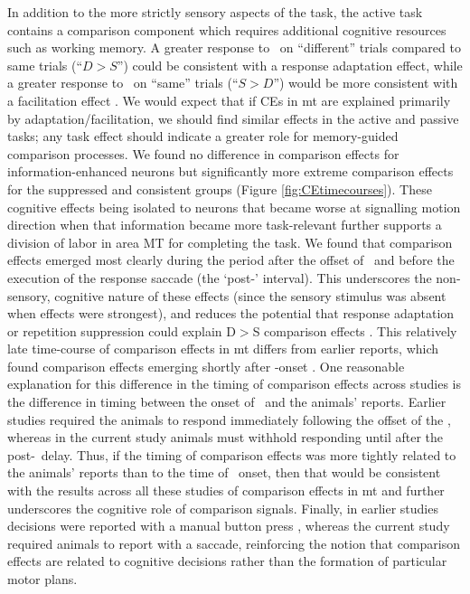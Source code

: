 In addition to the more strictly sensory aspects of the task, the active task contains a comparison component which requires additional cognitive resources such as working memory. 
A greater response to \test\ on ``different'' trials compared to same trials (``$D>S$'') could be consistent with a response adaptation effect, while a greater response to \test\ on ``same'' trials (``$S>D$'') would be more consistent with a facilitation effect \parencite{Kohn2003}. We would expect that if CEs in \gls{mt} are explained primarily by adaptation/facilitation, we should find similar effects in the active and passive tasks; any task effect should indicate a greater role for memory-guided comparison processes.
We found no difference in comparison effects for information-enhanced neurons but significantly more extreme comparison effects for the suppressed and consistent groups (Figure \ref{fig:CEtimecourses}).
These cognitive effects being isolated to neurons that became worse at signalling motion direction when that information became more task-relevant further supports a division of labor in area MT for completing the task.
We found that comparison effects emerged most clearly during the period after the offset of \test\ and before the execution of the response saccade (the `post-\test' interval). 
This underscores the non-sensory, cognitive nature of these effects (since the sensory stimulus was absent when effects were strongest), and reduces the potential that response adaptation or repetition suppression could explain D$>$S comparison effects \parencite{Lui2011,Kohn2003}.
This relatively late time-course of comparison effects in \gls{mt} differs from earlier reports, which found comparison effects emerging shortly after \test-onset \parencite{Lui2011,Zaksas2006}. 
One reasonable explanation for this difference in the timing of comparison effects across studies is the difference in timing between the onset of \test\ and the animals' reports. 
Earlier studies required the animals to respond immediately following the offset of the \test, whereas in the current study animals must withhold responding until after the post-\test\ delay. 
Thus, if the timing of comparison effects was more tightly related to the animals' reports than to the time of \test\ onset, then that would be consistent with the results across all these studies of comparison effects in \gls{mt} and further underscores the cognitive role of comparison signals.
Finally, in earlier studies decisions were reported with a manual button press \parencite{Lui2011,Zaksas2006}, whereas the current study required animals to report with a saccade, reinforcing the notion that comparison effects are related to cognitive decisions rather than the formation of particular motor plans.
